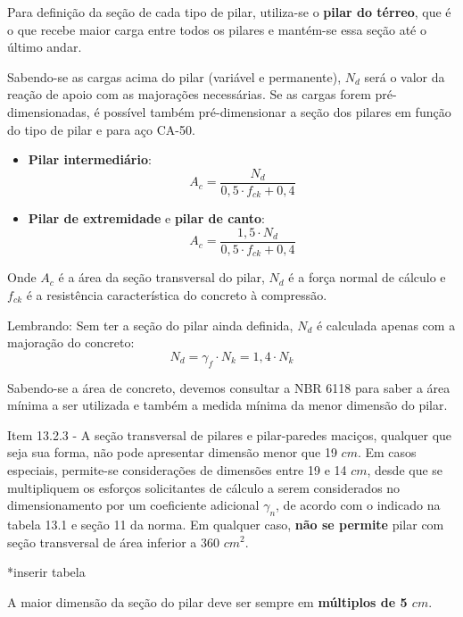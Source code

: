 Para definição da seção de cada tipo de pilar, utiliza-se o \textbf{pilar do térreo}, que é o que recebe maior carga entre todos os pilares e mantém-se essa seção até o último andar.

Sabendo-se as cargas acima do pilar (variável e permanente), $N_d$ será o valor da reação de apoio com as majorações necessárias. Se as cargas forem pré-dimensionadas, é possível também pré-dimensionar a seção dos pilares em função do tipo de pilar e para aço CA-50.

\begin{itemize}
	\item \textbf{Pilar intermediário}:
		\begin{equation}A_c=\frac{N_d}{0,5\cdot f_{ck}+0,4}\end{equation}
	\item \textbf{Pilar de extremidade} e \textbf{pilar de canto}:
		\begin{equation}A_c=\frac{1,5\cdot N_d}{0,5\cdot f_{ck}+0,4}\end{equation}
\end{itemize}

Onde $A_c$ é a área da seção transversal do pilar, $N_d$ é a força normal de cálculo e $f_{ck}$ é a resistência característica do concreto à compressão.

Lembrando: Sem ter a seção do pilar ainda definida, $N_d$ é calculada apenas com a majoração do concreto:
\begin{equation}N_d=\gamma_f\cdot N_k=1,4\cdot N_k\end{equation}

Sabendo-se a área de concreto, devemos consultar a NBR 6118 para saber a área mínima a ser utilizada e também a medida mínima da menor dimensão do pilar.

Item 13.2.3 - A seção transversal de pilares e pilar-paredes maciços, qualquer que seja sua forma, não pode apresentar dimensão menor que 19 $cm$. Em casos especiais, permite-se considerações de dimensões entre 19 e 14 $cm$, desde que se multipliquem os esforços solicitantes de cálculo a serem considerados no dimensionamento por um coeficiente adicional $\gamma_n$, de acordo com o indicado na tabela 13.1 e seção 11 da norma. Em qualquer caso, \textbf{não se permite} pilar com seção transversal de área inferior a 360 ${cm}^2$.

*inserir tabela

A maior dimensão da seção do pilar deve ser sempre em \textbf{múltiplos de 5 $cm$}.

